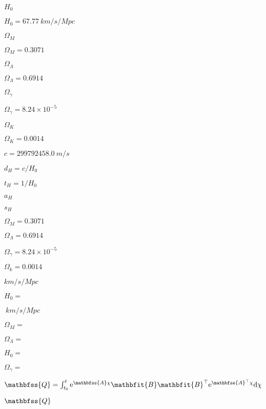 \documentclass{article}
\begin{document}
$H_{0}$
\pagebreak

$H_{0} = 67.77 \ km/s/Mpc$
\pagebreak

$\Omega_{M}$
\pagebreak

$\Omega_{M} = 0.3071$
\pagebreak

$\Omega_{\Lambda}$
\pagebreak

$\Omega_{\Lambda} = 0.6914$
\pagebreak

$\Omega_{\gamma}$
\pagebreak

$\Omega_{\gamma} = 8.24 \times 10^{-5}$
\pagebreak

$\Omega_{K}$
\pagebreak

$\Omega_{K} = 0.0014$
\pagebreak

$c = 299792458.0 \ m/s$
\pagebreak

$d_{H} = c/H_{0}$
\pagebreak

$t_{H} = 1/H_{0}$
\pagebreak

$ a_{H}$
\pagebreak

$ s_{H}$
\pagebreak

$ \Omega_{M} = 0.3071 $
\pagebreak

$ \Omega_{\Lambda} = 0.6914 $
\pagebreak

$ \Omega_{\gamma} = 8.24 \times 10^{-5} $
\pagebreak

$ \Omega_{k} = 0.0014 $
\pagebreak

$km/s/Mpc$
\pagebreak

$H_{0} = $
\pagebreak

$ \ km/s/Mpc$
\pagebreak

$\Omega_{M} =$
\pagebreak

$\Omega_{\Lambda} =$
\pagebreak

$H_{0} =$
\pagebreak

$\Omega_{\gamma} =$
\pagebreak

$\mathbfss{Q} = \int_{t_{0}}^{t} \mathrm{e}^{\mathbfss{A}\chi} \mathbfit{B} \mathbfit{B}^{\top} \mathrm{e}^{\mathbfss{A}^{\top}\chi} \mathrm{d}\chi$
\pagebreak

$\mathbfss{Q}$
\pagebreak
\end{document}
